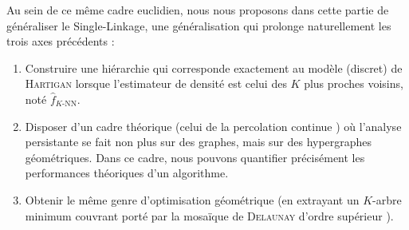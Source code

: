 \documentclass{these-ISSS} %
\begin{document}
Au sein de ce même cadre euclidien, nous nous proposons dans cette partie de généraliser le Single-Linkage, une généralisation qui prolonge naturellement les trois axes précédents :
\begin{enumerate}
    \item Construire une hiérarchie qui corresponde exactement au modèle (discret) de \textsc{Hartigan} lorsque l'estimateur de densité est celui des $K$ plus proches voisins, noté $\widehat f_{K\text{-NN}}$.
    \item Disposer d'un cadre théorique (celui de la percolation continue \cite{MeesterRoy, penrose2003}) où l'analyse persistante se fait non plus sur des graphes, mais sur des hypergraphes géométriques. Dans ce cadre, nous pouvons quantifier précisément les performances théoriques d'un algorithme.
    \item Obtenir le même genre d'optimisation géométrique (en extrayant un $K$-arbre minimum couvrant porté par la mosaïque de \textsc{Delaunay} d'ordre supérieur \cite{osangEdelsbrunner2023algorithm}).
\end{enumerate}
\end{document}
